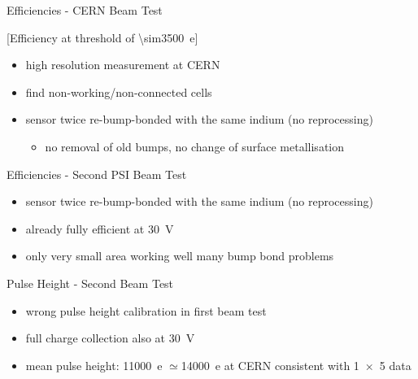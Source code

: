 \begin{frame}{Efficiencies - CERN Beam Test}

	[Efficiency at threshold of \SI{\sim3500}{e}]
	
	\begin{itemize}\itemfill
		\item high resolution measurement at CERN
		\item find non-working/non-connected cells
		\item sensor twice re-bump-bonded with the same indium (no reprocessing)
		\begin{itemize}
			\item no removal of old bumps, no change of surface metallisation
		\end{itemize}
	\end{itemize}
	
\end{frame}
\begin{frame}{Efficiencies - Second PSI Beam Test}

	
	\begin{itemize}\itemfill
		\item sensor twice re-bump-bonded with the same indium (no reprocessing)
		\item already fully efficient at \SI{30}{\volt}
		\item only very small area working well \ra many bump bond problems
	\end{itemize}
	
\end{frame}
\begin{frame}{Pulse Height - Second Beam Test}

	
	\begin{itemize}\itemfill
		\item wrong pulse height calibration in first beam test
		\item full charge collection also at \SI{30}{\volt}
		\item mean pulse height: \SI{11000}{e} \ra $\simeq$\SI{14000}{e} at CERN \ra consistent with \SI{1x5}{} data
	\end{itemize}
	
\end{frame}
